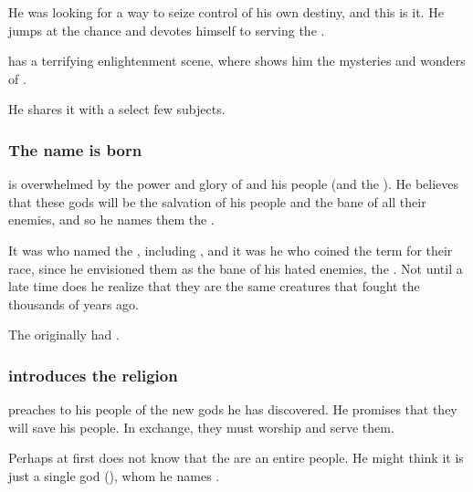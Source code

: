 He was looking for a way to seize control of his own destiny, and this is it. 
He jumps at the chance and devotes himself to serving the \banes.


\Semiza{} has a terrifying enlightenment scene, where \Daggerrain{} shows him the mysteries and wonders of . 

He shares it with a select few subjects.





\subsubsection{The name \quo\bane{} is born}
\Semiza{} is overwhelmed by the power and glory of \Daggerrain{} and his people (and the \Voidbringer). 
He believes that these gods will be the salvation of his people and the bane of all their enemies, and so he names them the \quo{\banes}. 

It was \Semiza{} who named the \banelords, including \Daggerrain, and it was he who coined the term \quo{\bane} for their race, since he envisioned them as the bane of his hated enemies, the \dragons. 
Not until a late time does he realize that they are the same creatures that fought the \dragons{} thousands of years ago. 

The \dragons originally had . 





\subsubsection{\Semiza{} introduces the \bane{} religion}
\Semiza{} preaches to his people of the new gods he has discovered. He promises that they will save his people. In exchange, they must worship and serve them. 

Perhaps at first \Semiza{} does not know that the \banes{} are an entire people. He might think it is just a single god (\Daggerrain), whom he names . 





